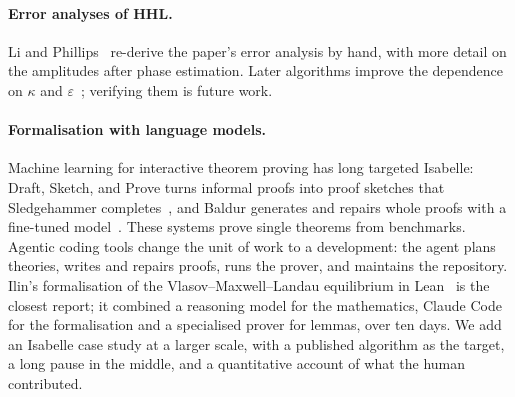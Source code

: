 \paragraph{Error analyses of HHL.} Li and Phillips~\cite{liphillips2024} re-derive the paper's error
analysis by hand, with more detail on the amplitudes after phase estimation. Later algorithms improve
the dependence on $\kappa$ and $\varepsilon$~\cite{childs2017}; verifying them is future work.

\paragraph{Formalisation with language models.} Machine learning for interactive theorem proving has
long targeted Isabelle: Draft, Sketch, and Prove turns informal proofs into proof sketches that
Sledgehammer completes~\cite{jiang2023dsp}, and Baldur generates and repairs whole proofs with a
fine-tuned model~\cite{first2023baldur}. These systems prove single theorems from benchmarks. Agentic
coding tools change the unit of work to a development: the agent plans theories, writes and repairs
proofs, runs the prover, and maintains the repository. Ilin's formalisation of the Vlasov--Maxwell--Landau
equilibrium in Lean~\cite{ilin2026vml} is the closest report; it combined a reasoning model for the
mathematics, Claude Code for the formalisation and a specialised prover for lemmas, over ten days. We
add an Isabelle case study at a larger scale, with a published algorithm as the target, a long pause in
the middle, and a quantitative account of what the human contributed.

